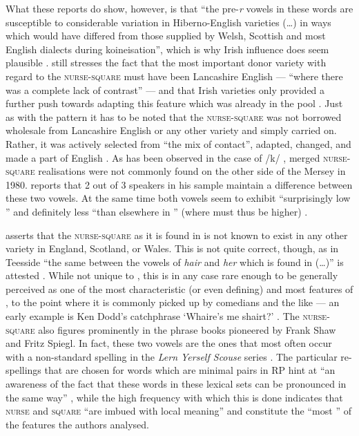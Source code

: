 What these reports do show, however, is that ``the pre-\emph{r} vowels in these words are susceptible to considerable variation in Hiberno-English varieties (\ldots) in ways which would have differed from those supplied by Welsh, Scottish and most English dialects during koineisation'', which is why Irish influence does seem plausible \citep[128]{honeybone2007}.
\parencite{honeybone2007} still stresses the fact that the most important donor variety with regard to the \textsc{nurse}-\textsc{square}  must have been Lancashire English --- ``where there was a complete lack of contrast'' --- and that Irish varieties only provided a further push towards adapting this feature which was already in the pool \citep[129]{honeybone2007}.
Just as with the   pattern it has to be noted that the \textsc{nurse}-\textsc{square}  was not borrowed wholesale from Lancashire English or any other variety and simply carried on. 
Rather, it was actively selected from ``the mix of  contact'', adapted, changed, and made a part of  English \parencite[cf.][129]{honeybone2007}.
As has been observed in the case of /k/ , merged \textsc{nurse}-\textsc{square} realisations were not commonly found on the other side of the Mersey in 1980.
\textcite[95]{newbrook1999} reports that 2 out of 3 speakers in his sample maintain a difference between these two vowels.
At the same time both vowels seem to exhibit ``surprisingly low '' and definitely less ``than elsewhere in '' (where  must thus be higher) \parencite[95]{newbrook1999}.

\citet[cf.][128]{honeybone2007} asserts that the \textsc{nurse}-\textsc{square}  as it is found in  is not known to exist in any other variety in England, Scotland, or Wales.
This is not quite correct, though, as in Teesside ``the same  between the vowels of \emph{hair} and \emph{her} which is found in  (\dots)'' is attested \parencite[70]{trudgill1999}.
While not unique to , this  is in any case rare enough to be generally perceived as one of the most characteristic (or even defining) and most  features of , to the point where it is commonly picked up by comedians and the like --- an early example is Ken Dodd's catchphrase `Whaire's me shairt?' \citep[cf.][73]{trudgill1999}.
The \textsc{nurse}-\textsc{square}  also figures prominently in the  phrase books pioneered by Frank Shaw and Fritz Spiegl.
In fact, these two vowels are the ones that most often occur with a non-standard spelling in the \emph{Lern Yerself Scouse} series \parencite[cf.][322]{honeybonewatson2013}.
The particular re-spellings that are chosen for words which are minimal pairs in RP hint at ``an awareness of the fact that these words in these lexical sets can be pronounced in the same way'' \parencite[324]{honeybonewatson2013}, while the high frequency with which this is done indicates that \textsc{nurse} and \textsc{square} ``are imbued with local meaning'' and constitute the ``most '' of the  features the authors analysed.

